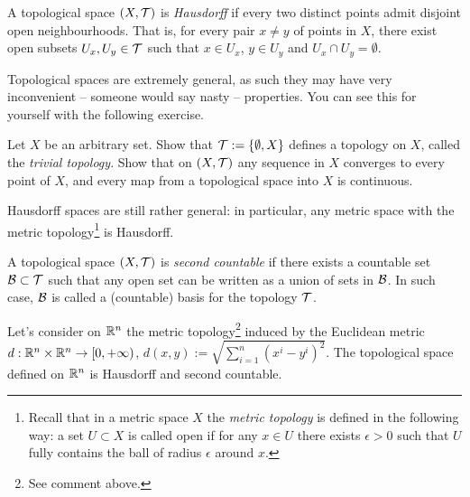 \begin{definition}
  A topological space $(X, \mathcal{T})$ is \emph{Hausdorff} if every two distinct points admit disjoint open neighbourhoods. That is, for every pair $x\neq y$ of points in $X$, there exist open subsets $U_x, U_y\in\mathcal{T}$ such that $x\in U_x$, $y\in U_y$ and $U_x \cap U_y = \emptyset$.
\end{definition}

Topological spaces are extremely general, as such they may have very inconvenient -- someone would say nasty -- properties.
You can see this for yourself with the following exercise.

\begin{exercise}
Let $X$ be an arbitrary set. Show that $\mathcal{T}:=\{\emptyset, X\}$ defines a topology on $X$, called the \emph{trivial topology}. Show that on $(X, \mathcal{T})$ any sequence in $X$ converges to every point of $X$, and every map from a topological space into $X$ is continuous.
\end{exercise}

Hausdorff spaces are still rather general: in particular, any metric space with the metric topology\footnote{Recall that in a metric space $X$ the \emph{metric topology} is defined in the following way: a set $U\subset X$ is called open if for any $x\in U$ there exists $\epsilon>0$ such that $U$ fully contains the ball of radius $\epsilon$ around $x$.} is Hausdorff.

\begin{definition}
  A topological space $(X, \mathcal{T})$ is \emph{second countable} if there exists a countable set $\mathcal{B}\subset\mathcal{T}$ such that any open set can be written as a union of sets in $\mathcal{B}$.
  In such case, $\mathcal{B}$ is called a (countable) basis for the topology $\mathcal{T}$.
\end{definition}

\begin{exercise}\label{exe:rntopsp}
  Let's consider on $\mathbb{R}^n$ the metric topology\footnote{See comment above.} induced by the Euclidean metric $d: \mathbb{R}^n \times \mathbb{R}^n \to [0, +\infty)$, $d(x,y) := \sqrt{\sum_{i=1}^n (x^i-y^i)^2}$.
  The topological space defined on $\mathbb{R}^n$ is Hausdorff and second countable.
\end{exercise}

